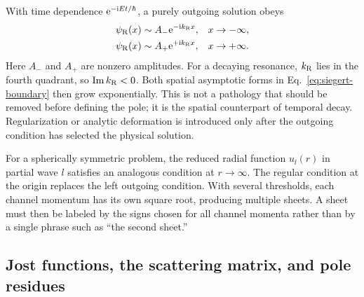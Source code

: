 With time dependence $\mathrm{e}^{-\mathrm{i} Et/\hbar}$, a purely outgoing solution obeys
\begin{align}
  \psi_{\mathrm{R}}(x)
  &\sim A_-\mathrm{e}^{-\mathrm{i} k_{\mathrm{R}}x},
  &&x\to-\infty,
  \notag\\
  \psi_{\mathrm{R}}(x)
  &\sim A_+\mathrm{e}^{+\mathrm{i} k_{\mathrm{R}}x},
  &&x\to+\infty .
  \label{eq:siegert-boundary}
\end{align}
Here $A_-$ and $A_+$ are nonzero amplitudes.  For a decaying resonance,
$k_{\mathrm{R}}$ lies in the fourth quadrant, so
$\operatorname{Im} k_{\mathrm{R}}<0$.  Both spatial asymptotic forms in
Eq.~\eqref{eq:siegert-boundary} then grow exponentially.  This is not a
pathology that should be removed before defining the pole; it is the spatial
counterpart of temporal decay.  Regularization or analytic deformation is
introduced only after the outgoing condition has selected the physical
solution.

For a spherically symmetric problem, the reduced radial function $u_l(r)$ in
partial wave $l$ satisfies an analogous condition at $r\to\infty$.  The
regular condition at the origin replaces the left outgoing condition.  With
several thresholds, each channel momentum has its own square root, producing
multiple sheets.  A sheet must then be labeled by the signs chosen for all
channel momenta rather than by a single phrase such as ``the second sheet.''

\subsection{Jost functions, the scattering matrix, and pole residues}
\label{subsec:jost}

